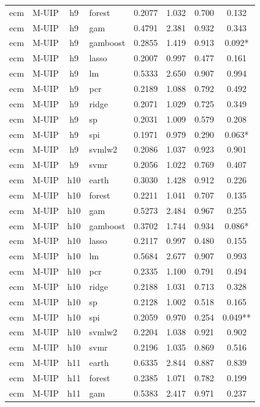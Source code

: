 \begin{ThreePartTable}
\begin{longtable}[t]{llclcccc}
ecm & M-UIP & h9 & forest & 0.2077 & 1.032 & 0.700 & 0.132\\
ecm & M-UIP & h9 & gam & 0.4791 & 2.381 & 0.932 & 0.343\\
ecm & M-UIP & h9 & gamboost & 0.2855 & 1.419 & 0.913 & 0.092*\\
ecm & M-UIP & h9 & lasso & 0.2007 & 0.997 & 0.477 & 0.161\\
ecm & M-UIP & h9 & lm & 0.5333 & 2.650 & 0.907 & 0.994\\
ecm & M-UIP & h9 & pcr & 0.2189 & 1.088 & 0.792 & 0.492\\
ecm & M-UIP & h9 & ridge & 0.2071 & 1.029 & 0.725 & 0.349\\
ecm & M-UIP & h9 & sp & 0.2031 & 1.009 & 0.579 & 0.208\\
ecm & M-UIP & h9 & spi & 0.1971 & 0.979 & 0.290 & 0.063*\\
ecm & M-UIP & h9 & svmlw2 & 0.2086 & 1.037 & 0.923 & 0.901\\
ecm & M-UIP & h9 & svmr & 0.2056 & 1.022 & 0.769 & 0.407\\
\addlinespace
ecm & M-UIP & h10 & earth & 0.3030 & 1.428 & 0.912 & 0.226\\
ecm & M-UIP & h10 & forest & 0.2211 & 1.041 & 0.707 & 0.135\\
ecm & M-UIP & h10 & gam & 0.5273 & 2.484 & 0.967 & 0.255\\
ecm & M-UIP & h10 & gamboost & 0.3702 & 1.744 & 0.934 & 0.086*\\
ecm & M-UIP & h10 & lasso & 0.2117 & 0.997 & 0.480 & 0.155\\
ecm & M-UIP & h10 & lm & 0.5684 & 2.677 & 0.907 & 0.993\\
ecm & M-UIP & h10 & pcr & 0.2335 & 1.100 & 0.791 & 0.494\\
ecm & M-UIP & h10 & ridge & 0.2188 & 1.031 & 0.713 & 0.328\\
ecm & M-UIP & h10 & sp & 0.2128 & 1.002 & 0.518 & 0.165\\
ecm & M-UIP & h10 & spi & 0.2059 & 0.970 & 0.254 & 0.049**\\
ecm & M-UIP & h10 & svmlw2 & 0.2204 & 1.038 & 0.921 & 0.902\\
ecm & M-UIP & h10 & svmr & 0.2196 & 1.035 & 0.869 & 0.516\\
\addlinespace
ecm & M-UIP & h11 & earth & 0.6335 & 2.844 & 0.887 & 0.839\\
ecm & M-UIP & h11 & forest & 0.2385 & 1.071 & 0.782 & 0.199\\
ecm & M-UIP & h11 & gam & 0.5383 & 2.417 & 0.971 & 0.237\\

\end{longtable}
\end{ThreePartTable}
